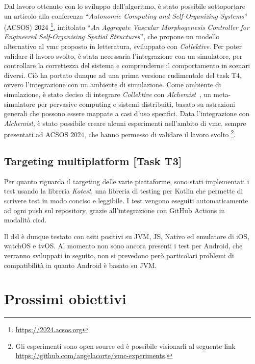 \documentclass[13pt, a4paper]{article}
\newcommand{\ck}{\emph{Collektive}}
\begin{document}
Dal lavoro ottenuto con lo sviluppo dell'algoritmo,
    è stato possibile sottoportare un articolo alla conferenza ``\emph{Autonomic Computing and Self-Organizing Systems}'' (ACSOS) 2024
    \footnote{\url{https://2024.acsos.org}},
    intitolato ``\emph{An Aggregate Vascular Morphogenesis Controller for Engineered Self-Organising Spatial Structures}'',
    che propone un modello alternativo al \ac{vmc} proposto in letteratura,
    sviluppato con \ck{}.
%
Per poter validare il lavoro svolto, è stata necessaria l'integrazione con un simulatore,
    per controllare la correttezza del sistema e comprenderne il comportamento in scenari diversi.
%
Ciò ha portato dunque ad una prima versione rudimentale del task T4, ovvero l'integrazione con un ambiente di simulazione.
%
Come ambiente di simulazione, è stato deciso di integrare \ck{} con \emph{Alchemist}~\cite{PianiniJOS2013},
    un meta-simulatore per pervasive computing e sistemi distribuiti,
    basato su astrazioni generali che possono essere mappate a casi d'uso specifici.
%
Data l'integrazione con \emph{Alchemist}, è stato possibile creare alcuni esperimenti nell'ambito di \ac{vmc},
    sempre presentati ad ACSOS 2024, che hanno permesso di validare il lavoro svolto \footnote{
    Gli esperimenti sono open source ed è possibile visionarli al seguente link \url{https://github.com/angelacorte/vmc-experiments}.
}.

\subsection{Targeting multiplatform [Task T3]}\label{subsec:task-t3-[targeting-multiplatform]}
Per quanto riguarda il targeting delle varie piattaforme,
    sono stati implementati i test usando la libreria \emph{Kotest},
    una libreria di testing per Kotlin che permette di scrivere test in modo conciso e leggibile.
%
I test vengono eseguiti automaticamente ad ogni push sul repository, grazie all'integrazione con GitHub Actions in modalità \ac{cicd}.

Il \ac{dsl} è dunque testato con esiti positivi su JVM, JS, Nativo ed emulatore di iOS, watchOS e tvOS.
%
Al momento non sono ancora presenti i test per Android, che verranno sviluppati in seguito,
    non si prevedono però particolari problemi di compatibilità in quanto Android è basato su JVM.

\section{Prossimi obiettivi}\label{sec:prossimi-obiettivi}
\end{document}
